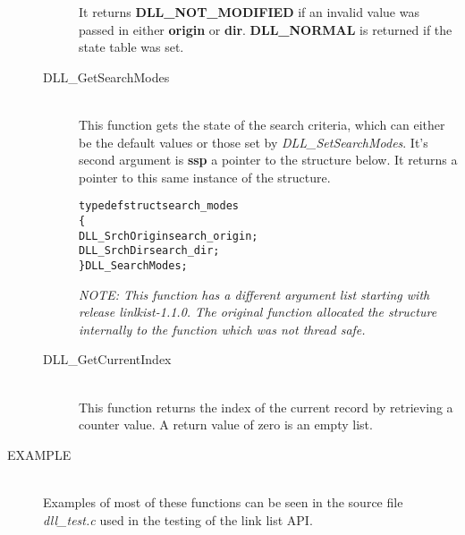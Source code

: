 \documentclass[10pt,letterpaper,titlepage]{article}
\begin{document}
\begin{description}
\begin{description}
 It returns \textbf{DLL\_NOT\_MODIFIED} if an invalid value was passed in either \textbf{origin} or \textbf{dir}.  \textbf{DLL\_NORMAL} is returned if the state table was set.

 \item[DLL\_GetSearchModes]\quad\\
 This function gets the state of the search criteria, which can either be the default values or those set by \emph{DLL\_SetSearchModes}.  It's second argument is \textbf{ssp} a pointer to the structure below.  It returns a pointer to this same instance of the structure.

 \begin{alltt}
   typedef struct search_modes
      \{
      DLL_SrchOrigin search_origin;
      DLL_SrchDir    search_dir;
      \} DLL_SearchModes;
 \end{alltt}

\emph{NOTE: This function has a different argument list starting with release linlkist-1.1.0.  The original function allocated the structure internally to the function which was not thread safe.}

 \item[DLL\_GetCurrentIndex]\quad\\
 This function returns the index of the current record by retrieving a counter value.  A return value of zero is an empty list.
 \end{description}

\item[EXAMPLE]\quad\\
Examples of most of these functions can be seen in the source file \emph{dll\_test.c} used in the testing of the link list API.

\end{description}
\pagebreak
\end{document}
